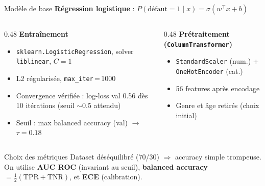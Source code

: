 \documentclass[aspectratio=169, 11pt]{beamer}
\begin{document}
\begin{frame}{Mod\`ele de base}
\textbf{R\'egression logistique} :
$P(\text{d\'efaut}=1 \mid x) = \sigma(w^\top x + b)$

\vspace{0.5em}
\begin{columns}[T]
\begin{column}{0.48\textwidth}
\textbf{Entra\^inement}
\begin{itemize}
    \item \texttt{sklearn.LogisticRegression}, solver \texttt{liblinear}, $C{=}1$
    \item L2 r\'egularis\'ee, \texttt{max\_iter}\,=\,1000
    \item Convergence v\'erifi\'ee : log-loss val 0.56 d\`es 10 it\'erations (seuil $\sim$0.5 attendu)
    \item Seuil : max balanced accuracy (val) $\to$ $\tau{=}0.18$
\end{itemize}
\end{column}
\begin{column}{0.48\textwidth}
\textbf{Pr\'etraitement (\texttt{ColumnTransformer})}
\begin{itemize}
    \item \texttt{StandardScaler} (num.) + \texttt{OneHotEncoder} (cat.)
    \item 56 features apr\`es encodage
    \item Genre et \^age retir\'es (choix initial)
\end{itemize}
\end{column}
\end{columns}

\vspace{0.5em}
\begin{block}{Choix des m\'etriques}
Dataset d\'es\'equilibr\'e (70/30) $\Rightarrow$ accuracy simple trompeuse. \\
On utilise \textbf{AUC ROC} (invariant au seuil), \textbf{balanced accuracy}
$= \frac{1}{2}(\text{TPR} + \text{TNR})$, et \textbf{ECE} (calibration).
\end{block}
\end{frame}
\end{document}
